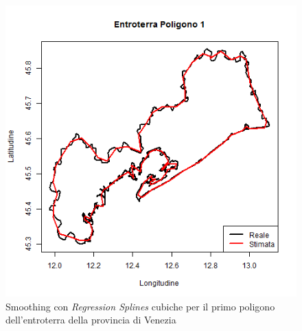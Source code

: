\documentclass[a4paper,11pt,twoside,openright]{book}							%
\begin{document}
\begin{figure}[t]
\begin{minipage}{.32\textwidth}
	\end{minipage}%
	\begin{minipage}{.64\textwidth}
	\includegraphics[width=\textwidth]{Immagini/Ven_Regione.png}
	\end{minipage}
	\caption{Smoothing con \textit{Regression Splines} cubiche per il primo poligono dell'entroterra della provincia di Venezia}
	\label{fig:Ven_ent1}
\end{figure}
\end{document}
